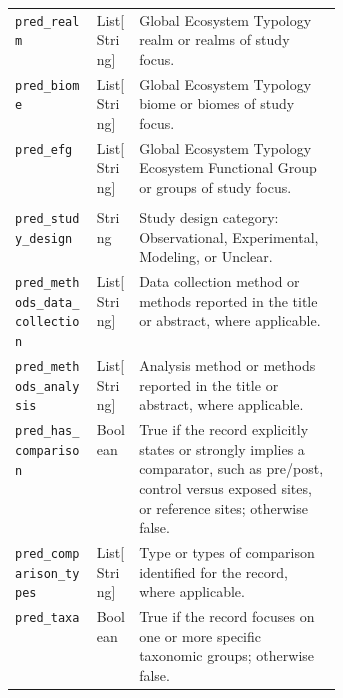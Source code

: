 \documentclass[12pt]{article}
\begin{document}
\begin{landscape}
\begin{table}[p]
\begin{tabularx}{\linewidth}{|>{\raggedright\arraybackslash}p{0.25\linewidth}
                             |>{\raggedright\arraybackslash}p{0.13\linewidth}
                             |>{\raggedright\arraybackslash}X|}
\multicolumn{3}{|l|}{\textit{L4: Ecosystem Typology}} \\
\hline
\texttt{pred\_realm} & List[String] & Global Ecosystem Typology realm or realms of study focus. \\
\hline
\texttt{pred\_biome} & List[String] & Global Ecosystem Typology biome or biomes of study focus. \\
\hline
\texttt{pred\_efg} & List[String] & Global Ecosystem Typology Ecosystem Functional Group or groups of study focus. \\
\hline

\multicolumn{3}{|l|}{\textit{L5: Study Attributes}} \\
\hline
\texttt{pred\_study\_design} & String & Study design category: Observational, Experimental, Modeling, or Unclear. \\
\hline
\texttt{pred\_methods\_data\_collection} & List[String] & Data collection method or methods reported in the title or abstract, where applicable. \\
\hline
\texttt{pred\_methods\_analysis} & List[String] & Analysis method or methods reported in the title or abstract, where applicable. \\
\hline
\texttt{pred\_has\_comparison} & Boolean & True if the record explicitly states or strongly implies a comparator, such as pre/post, control versus exposed sites, or reference sites; otherwise false. \\
\hline
\texttt{pred\_comparison\_types} & List[String] & Type or types of comparison identified for the record, where applicable. \\
\hline
\texttt{pred\_taxa} & Boolean & True if the record focuses on one or more specific taxonomic groups; otherwise false. \\
\hline


\end{tabularx}
\end{table}
\end{landscape}
\end{document}

